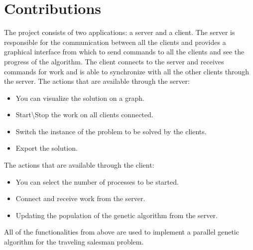 \pagebreak
\section*{Contributions}

The project consists of two applications: a server and a client. The server is responsible for the communication between all the clients and provides a graphical interface from which to send commands to all the clients and see the progress of the algorithm. The client connects to the server and receives commands for work and is able to synchronize with all the other clients through the server.
\newline
The actions that are available through the server:
\begin{itemize}
  \item You can visualize the solution on a graph.
  \item Start\textbackslash Stop the work on all clients connected.
  \item Switch the instance of the problem to be solved by the clients.
  \item Export the solution.
\end{itemize}
\bigskip
The actions that are available through the client:
\begin{itemize}
  \item You can select the number of processes to be started.
  \item Connect and receive work from the server.
  \item Updating the population of the genetic algorithm from the server.
\end{itemize}
\bigskip
All of the functionalities from above are used to implement a parallel genetic algorithm for the traveling salesman problem.